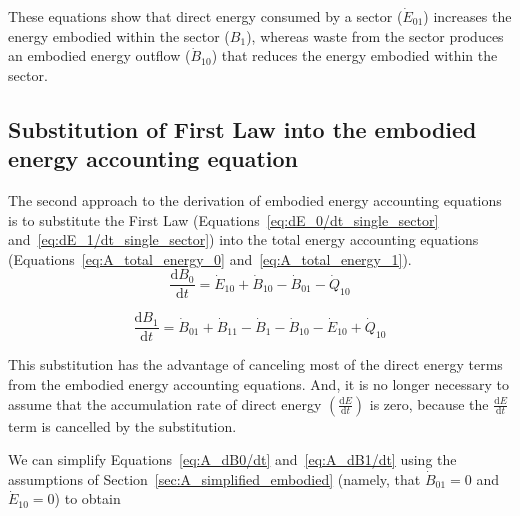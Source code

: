 These equations show that direct energy consumed by a 
sector ($\dot{E}_{01}$) increases the energy embodied within the sector ($B_1$), 
whereas waste from the sector produces an embodied
energy outflow ($\dot{B}_{10}$) that reduces 
the energy embodied within the sector. 


\subsection{Substitution of First Law into the embodied energy accounting equation} %
\label{subsec:A_first_law_embodied}

The second approach to the derivation of embodied energy
accounting equations is to substitute the First Law
(Equations~\ref{eq:dE_0/dt_single_sector} and~\ref{eq:dE_1/dt_single_sector}) 
into the total energy accounting equations 
(Equations~\ref{eq:A_total_energy_0} and~\ref{eq:A_total_energy_1}). 
\begin{equation} \label{eq:A_dB0/dt}
	\frac{\mathrm{d}B_{0}}{\mathrm{d}t} 
	= \dot{E}_{10}
	+ \dot{B}_{10} 
	- \dot{B}_{01}
	- \dot{Q}_{10}
\end{equation}

\begin{equation} \label{eq:A_dB1/dt}
	\frac{\mathrm{d}B_{1}}{\mathrm{d}t} 
	= \dot{B}_{01} 
	+ \dot{B}_{11}
	- \dot{B}_{1}
	- \dot{B}_{10}
	- \dot{E}_{10}
	+ \dot{Q}_{10}
\end{equation}

This substitution has the advantage of canceling most 
of the direct energy terms from the embodied energy accounting equations.
And, it is no longer necessary to assume that the 
accumulation rate of direct energy 
$\left( \frac{\mathrm{d}E}{\mathrm{d}t} \right)$
is zero, because the 
$\frac{\mathrm{d}E}{\mathrm{d}t}$
term is cancelled by the substitution.

% 
% 
%
We can simplify 
Equations~\ref{eq:A_dB0/dt} and~\ref{eq:A_dB1/dt} 
using the assumptions of Section~\ref{sec:A_simplified_embodied} 
(namely, that $\dot{B}_{01} = 0$ and $\dot{E}_{10} = 0$)
to obtain

